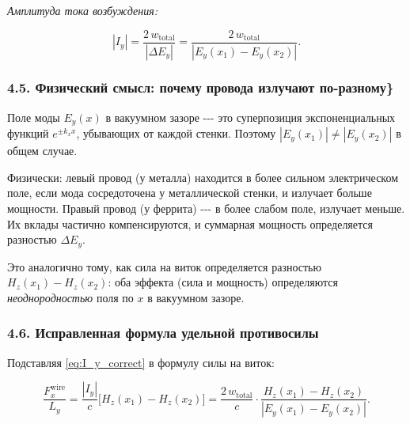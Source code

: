 \documentclass[11pt]{article}
\begin{document}
\emph{Амплитуда тока возбуждения:}

\begin{equation}
    \boxed{
        |I_y| = \frac{2\,w_{\mathrm{total}}}{|\Delta E_y|}
              = \frac{2\,w_{\mathrm{total}}}{|E_y(x_1) - E_y(x_2)|}.
    }
    \label{eq:I_y_correct}
\end{equation}

\subsubsection{4.5. Физический смысл: почему провода излучают
по-разному\}}\label{ux444ux438ux437ux438ux447ux435ux441ux43aux438ux439-ux441ux43cux44bux441ux43b-ux43fux43eux447ux435ux43cux443-ux43fux440ux43eux432ux43eux434ux430-ux438ux437ux43bux443ux447ux430ux44eux442-ux43fux43e-ux440ux430ux437ux43dux43eux43cux443}

Поле моды \(E_y(x)\) в вакуумном зазоре -\/-\/- это суперпозиция
экспоненциальных функций \(e^{\pm k_x x}\), убывающих от каждой стенки.
Поэтому \(|E_y(x_1)| \neq |E_y(x_2)|\) в общем случае.

Физически: левый провод (у металла) находится в более сильном
электрическом поле, если мода сосредоточена у металлической стенки, и
излучает больше мощности. Правый провод (у феррита) -\/-\/- в более
слабом поле, излучает меньше. Их вклады частично компенсируются, и
суммарная мощность определяется разностью \(\Delta E_y\).

Это аналогично тому, как сила на виток определяется разностью
\(H_z(x_1) - H_z(x_2)\): оба эффекта (сила и мощность) определяются
\emph{неоднородностью} поля по \(x\) в вакуумном зазоре.

\subsubsection{4.6. Исправленная формула удельной
противосилы}\label{ux438ux441ux43fux440ux430ux432ux43bux435ux43dux43dux430ux44f-ux444ux43eux440ux43cux443ux43bux430-ux443ux434ux435ux43bux44cux43dux43eux439-ux43fux440ux43eux442ux438ux432ux43eux441ux438ux43bux44b}

Подставляя \eqref{eq:I_y_correct} в формулу силы на виток:

\begin{equation*}
    \frac{F_x^{\mathrm{wire}}}{L_y}
    = \frac{|I_y|}{c}\bigl[H_z(x_1) - H_z(x_2)\bigr]
    = \frac{2\,w_{\mathrm{total}}}{c}\cdot
      \frac{H_z(x_1) - H_z(x_2)}{|E_y(x_1) - E_y(x_2)|}.
\end{equation*}
\end{document}
